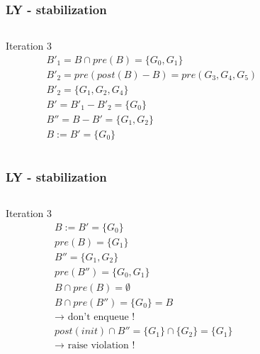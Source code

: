 \documentclass[11pt,handout]{beamer}
\begin{document}
\begin{frame}[fragile]
  \frametitle{LY - stabilization}
  \begin{columns}
    \begin{column}{0.5\textwidth}
      Iteration 3
      \begin{align*}
        & B'_1 = B \cap pre(B) = \{ G_0,G_1\} \\
        & B'_2 = pre(post(B) - B) = pre(G_3,G_4,G_5)  \\
        & B'_2 =  \{G_1,G_2,G_4\} \\
        & B' = B'_1 - B'_2 = \{G_0\} \\
        & B'' = B - B' = \{G_1,G_2\} \\
        & B := B' = \{G_0\}
      \end{align*}
    \end{column}
    \begin{column}{0.5\textwidth}%
      
    \end{column}
  \end{columns}
\end{frame}

\begin{frame}[fragile]
  \frametitle{LY - stabilization}
  \begin{columns}
    \begin{column}{0.5\textwidth}
      Iteration 3
      \begin{align*}
        & B := B' = \{G_0\} \\
        & pre(B) = \{G_1\} \\
        & B'' = \{G_1,G_2\} \\
        & pre(B'') = \{G_0,G_1\} \\
        & B \cap pre(B) = \emptyset \\
        & B \cap pre(B'') = \{G_0\} = B \\
        & \to \text{ don't enqueue !} \\
        & post(init) \cap B'' = \{G_1\} \cap \{G_2\} = \{G_1\} \\
        & \to \text{ raise violation !}
      \end{align*}
    \end{column}
    \begin{column}{0.5\textwidth}%
      
    \end{column}
  \end{columns}
\end{frame}
\end{document}
